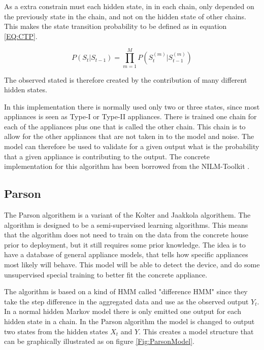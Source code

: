 As a extra constrain must each hidden state, in in each chain, only depended on the previously state in the chain, and not on the hidden state of other chains. This makes the state transition probability to be defined as in equation \ref{EQ:CTP}. 

\begin{equation}
	P(S_t|S_{t-1}) = \prod_{m = 1}^M P\left( S_t^{(m)}| S_{t-1}^{(m)} \right)
	\label{EQ:CTP}
\end{equation}

The observed stated is therefore created by the contribution of many different hidden states. 

In this implementation there is normally used only two or three states, since most appliances is seen as Type-I or Type-II appliances. There is trained one chain for each of the appliances plus one that is called the other chain. This chain is to allow for the other appliances that are not taken in to the model and noise. The model can therefore be used to validate for a given output what is the probability that a given appliance is contributing to the output. The concrete implementation for this algorithm has been borrowed from the NILM-Toolkit \citep{RefWorks:21}. 

\subsection{Parson}
The Parson algorithem is a variant of the Kolter and Jaakkola algorithem\citep{RefWorks:22}. The algorithm is designed to be a semi-supervised learning algorithms. This means that the algorithm does not need to train on the data from the concrete house prior to deployment, but it still requires some prior knowledge. The idea is to have a database of general appliance models, that tells how specific appliances most likely will behave. This model will be able to detect the device, and do some unsupervised special training to better fit the concrete appliance. 

The algorithm is based on a kind of HMM called "difference HMM" since they take the step difference in the aggregated data and use as the observed output $Y_t$. In a normal hidden Markov model there is only emitted one output for each hidden state in a chain. In the Parson algorithm the model is changed to output two states from the hidden states $X_t$ and $Y$. This creates a model structure that can be graphically illustrated as on figure \ref{Fig:ParsonModel}\citep{RefWorks:28}. 

